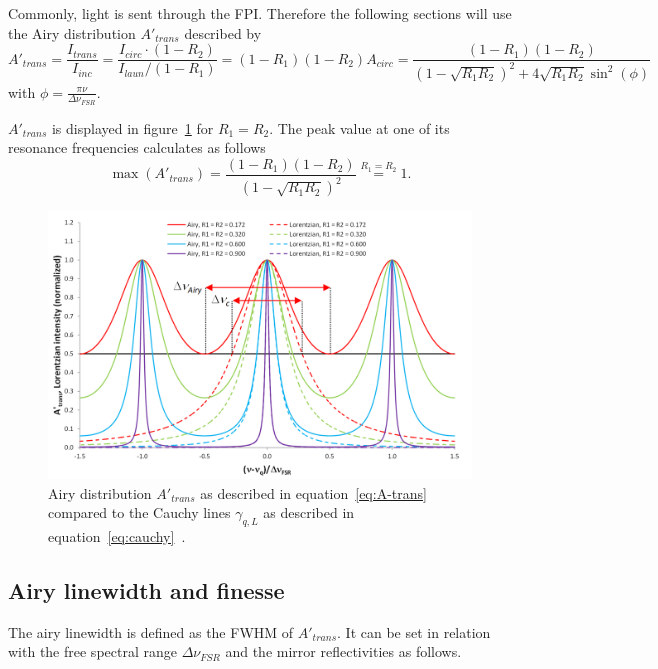 Commonly, light is sent through the \ac{FPI}. Therefore the following sections will use the Airy distribution $A'_{trans}$ described by
\begin{equation}
\label{eq:A-trans}
A'_{trans} = \frac{I_{trans}}{I_{inc}} = \frac{I_{circ} \cdot (1 - R_2)}{I_{laun} / (1 - R_1)} = (1-R_1)(1-R_2)A_{circ} = \frac{(1-R_1)(1-R_2)}{\left(1-\sqrt{R_1R_2}\right)^2+4\sqrt{R_1R_2}\sin^2(\phi)}
\end{equation}
with $\phi=\frac{\pi\nu}{\Delta \nu_{FSR}}$.

$A'_{trans}$ is displayed in figure~\ref{fig:airydistributionofafabry-perotinterferometer} for $R_1=R_2$. The peak value at one of its resonance frequencies calculates as follows
\begin{equation}
\max(A'_{trans}) = \frac{(1-R_1)(1-R_2)}{\left(1-\sqrt{R_1R_2}\right)^2} \stackrel{R_1=R_2}{=} 1.
\end{equation}

\begin{figure}[h]
	\centering
	\includegraphics[width=0.8\linewidth]{figures/fabry-perot/Airy_distribution_of_a_Fabry-Perot_interferometer}
	\caption[Airy distribution $A'_{trans}$]{Airy distribution $A'_{trans}$ as described in equation~\eqref{eq:A-trans} compared to the Cauchy lines  $\gamma_{q,L}$ as described in equation~\eqref{eq:cauchy}~\cite{noauthor_fabryperot_nodate}.}
	\label{fig:airydistributionofafabry-perotinterferometer}
\end{figure}


\subsection{Airy linewidth and finesse}
The airy linewidth is defined as the \ac{FWHM} of $A'_{trans}$. It can be set in relation with the free spectral range $\Delta \nu_{FSR}$ and the mirror reflectivities as follows.

